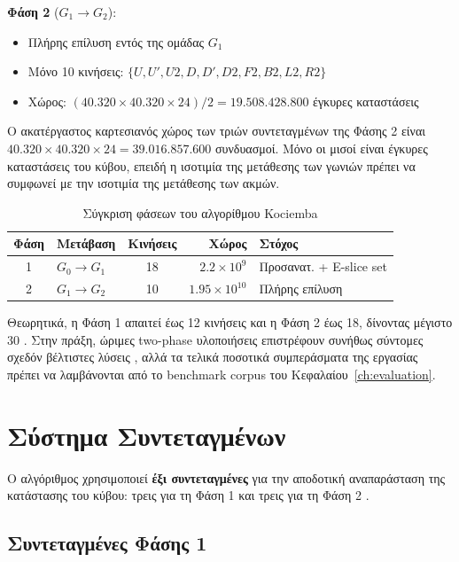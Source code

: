 \textbf{Φάση 2} ($G_1 \to G_2$):
\begin{itemize}
    \item Πλήρης επίλυση εντός της ομάδας $G_1$
    \item Μόνο 10 κινήσεις: $\{U, U', U2, D, D', D2, F2, B2, L2, R2\}$
    \item Χώρος: $(40.320 \times 40.320 \times 24)/2 = 19.508.428.800$ έγκυρες καταστάσεις
\end{itemize}

Ο ακατέργαστος καρτεσιανός χώρος των τριών συντεταγμένων της Φάσης 2
είναι $40.320 \times 40.320 \times 24 = 39.016.857.600$ συνδυασμοί.
Μόνο οι μισοί είναι έγκυρες καταστάσεις του κύβου, επειδή η ισοτιμία
της μετάθεσης των γωνιών πρέπει να συμφωνεί με την ισοτιμία της
μετάθεσης των ακμών.

\begin{table}[h]
\centering
\caption{Σύγκριση φάσεων του αλγορίθμου Kociemba}
\label{tab:kociemba_phases}
\begin{tabular}{clcrl}
\toprule
\textbf{Φάση} & \textbf{Μετάβαση} & \textbf{Κινήσεις} & \textbf{Χώρος} & \textbf{Στόχος} \\
\midrule
1 & $G_0 \to G_1$ & 18 & $2.2 \times 10^9$ & Προσανατ. + E-slice set \\
2 & $G_1 \to G_2$ & 10 & $1.95 \times 10^{10}$ & Πλήρης επίλυση \\
\bottomrule
\end{tabular}
\end{table}

Θεωρητικά, η Φάση 1 απαιτεί έως 12 κινήσεις και η Φάση 2 έως 18, δίνοντας μέγιστο 30 \cite{kociemba_twophase,kociemba_twophase_details}. Στην πράξη, ώριμες two-phase υλοποιήσεις επιστρέφουν συνήθως σύντομες σχεδόν βέλτιστες λύσεις \cite{kociemba_moves20,kociemba_website}, αλλά τα τελικά ποσοτικά συμπεράσματα της εργασίας πρέπει να λαμβάνονται από το benchmark corpus του Κεφαλαίου~\ref{ch:evaluation}.


\section{Σύστημα Συντεταγμένων}
\label{sec:kociemba_coords}

Ο αλγόριθμος χρησιμοποιεί \textbf{έξι συντεταγμένες} για την αποδοτική αναπαράσταση της κατάστασης του κύβου: τρεις για τη Φάση 1 και τρεις για τη Φάση 2 \cite{kociemba_twophase,kociemba_twophase_details}.

\subsection{Συντεταγμένες Φάσης 1}

